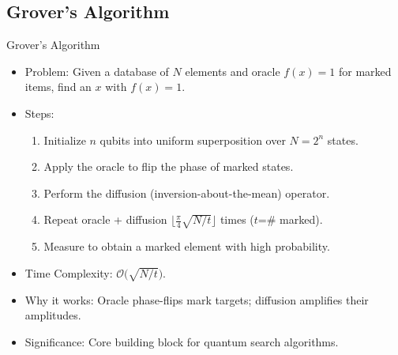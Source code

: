 \documentclass{beamer}
\begin{document}
\subsection{Grover's Algorithm}
\begin{frame}{Grover's Algorithm}
    \begin{itemize}
        \item Problem: Given a database of \(N\) elements and oracle \(f(x)=1\) for marked items, find an \(x\) with \(f(x)=1\).
        \item Steps:
              \begin{enumerate}
                  \item Initialize \(n\) qubits into uniform superposition over \(N=2^n\) states.
                  \item Apply the oracle to flip the phase of marked states.
                  \item Perform the diffusion (inversion-about-the-mean) operator.
                  \item Repeat oracle + diffusion \(\bigl\lfloor\frac{\pi}{4}\sqrt{N/t}\bigr\rfloor\) times (\(t\)=\# marked).
                  \item Measure to obtain a marked element with high probability.
              \end{enumerate}
        \item Time Complexity: \(\mathcal{O}\!\bigl(\sqrt{N/t}\bigr)\).
        \item Why it works: Oracle phase-flips mark targets; diffusion amplifies their amplitudes.
        \item Significance: Core building block for quantum search algorithms.
    \end{itemize}
\end{frame}
\end{document}
